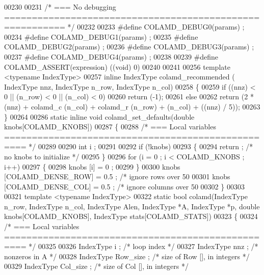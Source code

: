 \begin{DoxyCode}
00230 
00231 \textcolor{comment}{/* === No debugging ========================================================= */}
00232 
00233 \textcolor{preprocessor}{#define COLAMD\_DEBUG0(params) ;}
00234 \textcolor{preprocessor}{#define COLAMD\_DEBUG1(params) ;}
00235 \textcolor{preprocessor}{#define COLAMD\_DEBUG2(params) ;}
00236 \textcolor{preprocessor}{#define COLAMD\_DEBUG3(params) ;}
00237 \textcolor{preprocessor}{#define COLAMD\_DEBUG4(params) ;}
00238 
00239 \textcolor{preprocessor}{#define COLAMD\_ASSERT(expression) ((void) 0)}
00240 
00241 
00256 \textcolor{keyword}{template} <\textcolor{keyword}{typename} IndexType>
00257 \textcolor{keyword}{inline} IndexType colamd\_recommended ( IndexType nnz, IndexType n\_row, IndexType n\_col)
00258 \{
00259   \textcolor{keywordflow}{if} ((nnz) < 0 || (n\_row) < 0 || (n\_col) < 0)
00260     \textcolor{keywordflow}{return} (-1);
00261   \textcolor{keywordflow}{else}
00262     \textcolor{keywordflow}{return} (2 * (nnz) + colamd\_c (n\_col) + colamd\_r (n\_row) + (n\_col) + ((nnz) / 5)); 
00263 \}
00264 
00286 \textcolor{keyword}{static} \textcolor{keyword}{inline} \textcolor{keywordtype}{void} colamd\_set\_defaults(\textcolor{keywordtype}{double} knobs[COLAMD\_KNOBS])
00287 \{
00288   \textcolor{comment}{/* === Local variables ================================================== */}
00289   
00290   \textcolor{keywordtype}{int} i ;
00291 
00292   \textcolor{keywordflow}{if} (!knobs)
00293   \{
00294     return ;      \textcolor{comment}{/* no knobs to initialize */}
00295   \}
00296   \textcolor{keywordflow}{for} (i = 0 ; i < COLAMD\_KNOBS ; i++)
00297   \{
00298     knobs [i] = 0 ;
00299   \}
00300   knobs [COLAMD\_DENSE\_ROW] = 0.5 ;  \textcolor{comment}{/* ignore rows over 50%
00301   knobs [COLAMD\_DENSE\_COL] = 0.5 ;  \textcolor{comment}{/* ignore columns over 50%
00302 \}
00303 
00321 \textcolor{keyword}{template} <\textcolor{keyword}{typename} IndexType>
00322 \textcolor{keyword}{static} \textcolor{keywordtype}{bool} colamd(IndexType n\_row, IndexType n\_col, IndexType Alen, IndexType *A, IndexType *p, \textcolor{keywordtype}{double} 
      knobs[COLAMD\_KNOBS], IndexType stats[COLAMD\_STATS])
00323 \{
00324   \textcolor{comment}{/* === Local variables ================================================== */}
00325   
00326   IndexType i ;     \textcolor{comment}{/* loop index */}
00327   IndexType nnz ;     \textcolor{comment}{/* nonzeros in A */}
00328   IndexType Row\_size ;    \textcolor{comment}{/* size of Row [], in integers */}
00329   IndexType Col\_size ;    \textcolor{comment}{/* size of Col [], in integers */}
}}
\end{DoxyCode}
